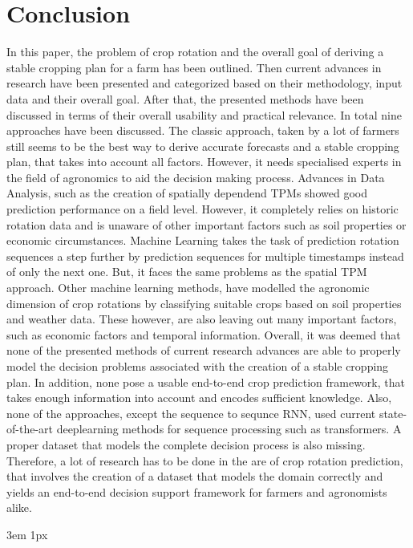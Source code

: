 \documentclass{Academic}
\begin{document}
    \section{Conclusion}
    In this paper, the problem of crop rotation and the overall goal of deriving a stable cropping plan for a farm has been outlined. Then current advances in research have been presented and categorized based on their methodology, input data and their overall goal. After that, the presented methods have been discussed in terms of their overall usability and practical relevance. In total nine approaches have been discussed. The classic approach, taken by a lot of farmers still seems to be the best way to derive accurate forecasts and a stable cropping plan, that takes into account all factors. However, it needs specialised experts in the field of agronomics to aid the decision making process. Advances in Data Analysis, such as the creation of spatially dependend TPMs showed good prediction performance on a field level. However, it completely relies on historic rotation data and is unaware of other important factors such as soil properties or economic circumstances. Machine Learning takes the task of prediction rotation sequences a step further by prediction sequences for multiple timestamps instead of only the next one. But, it faces the same problems as the spatial TPM approach. Other machine learning methods, have modelled the agronomic dimension of crop rotations by classifying suitable crops based on soil properties and weather data. These however, are also leaving out many important factors, such as economic factors and temporal information. Overall, it was deemed that none of the presented methods of current research advances are able to properly model the decision problems associated with the creation of a stable cropping plan. In addition, none pose a usable end-to-end crop prediction framework, that takes enough information into account and encodes sufficient knowledge. Also, none of the approaches, except the sequence to sequnce RNN, used current state-of-the-art deeplearning methods for sequence processing such as transformers. A proper dataset that models the complete decision process is also missing. Therefore, a lot of research has to be done in the are of crop rotation prediction, that involves the creation of a dataset that models the domain correctly and yields an end-to-end decision support framework for farmers and agronomists alike.

    \singlespacing
    \emergencystretch 3em
    \hfuzz 1px
    \printbibliography[heading=bibnumbered]




\end{document}
